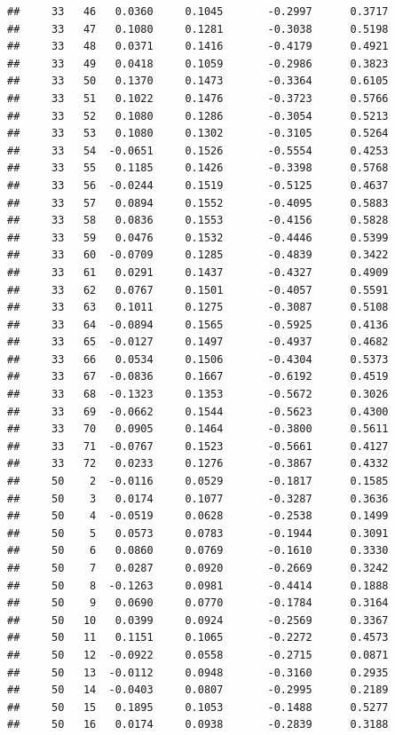 \documentclass[
]{article}
\begin{document}
\begin{verbatim}
##     33   46   0.0360     0.1045       -0.2997      0.3717  
##     33   47   0.1080     0.1281       -0.3038      0.5198  
##     33   48   0.0371     0.1416       -0.4179      0.4921  
##     33   49   0.0418     0.1059       -0.2986      0.3823  
##     33   50   0.1370     0.1473       -0.3364      0.6105  
##     33   51   0.1022     0.1476       -0.3723      0.5766  
##     33   52   0.1080     0.1286       -0.3054      0.5213  
##     33   53   0.1080     0.1302       -0.3105      0.5264  
##     33   54  -0.0651     0.1526       -0.5554      0.4253  
##     33   55   0.1185     0.1426       -0.3398      0.5768  
##     33   56  -0.0244     0.1519       -0.5125      0.4637  
##     33   57   0.0894     0.1552       -0.4095      0.5883  
##     33   58   0.0836     0.1553       -0.4156      0.5828  
##     33   59   0.0476     0.1532       -0.4446      0.5399  
##     33   60  -0.0709     0.1285       -0.4839      0.3422  
##     33   61   0.0291     0.1437       -0.4327      0.4909  
##     33   62   0.0767     0.1501       -0.4057      0.5591  
##     33   63   0.1011     0.1275       -0.3087      0.5108  
##     33   64  -0.0894     0.1565       -0.5925      0.4136  
##     33   65  -0.0127     0.1497       -0.4937      0.4682  
##     33   66   0.0534     0.1506       -0.4304      0.5373  
##     33   67  -0.0836     0.1667       -0.6192      0.4519  
##     33   68  -0.1323     0.1353       -0.5672      0.3026  
##     33   69  -0.0662     0.1544       -0.5623      0.4300  
##     33   70   0.0905     0.1464       -0.3800      0.5611  
##     33   71  -0.0767     0.1523       -0.5661      0.4127  
##     33   72   0.0233     0.1276       -0.3867      0.4332  
##     50    2  -0.0116     0.0529       -0.1817      0.1585  
##     50    3   0.0174     0.1077       -0.3287      0.3636  
##     50    4  -0.0519     0.0628       -0.2538      0.1499  
##     50    5   0.0573     0.0783       -0.1944      0.3091  
##     50    6   0.0860     0.0769       -0.1610      0.3330  
##     50    7   0.0287     0.0920       -0.2669      0.3242  
##     50    8  -0.1263     0.0981       -0.4414      0.1888  
##     50    9   0.0690     0.0770       -0.1784      0.3164  
##     50   10   0.0399     0.0924       -0.2569      0.3367  
##     50   11   0.1151     0.1065       -0.2272      0.4573  
##     50   12  -0.0922     0.0558       -0.2715      0.0871  
##     50   13  -0.0112     0.0948       -0.3160      0.2935  
##     50   14  -0.0403     0.0807       -0.2995      0.2189  
##     50   15   0.1895     0.1053       -0.1488      0.5277  
##     50   16   0.0174     0.0938       -0.2839      0.3188  

\end{verbatim}
\end{document}
